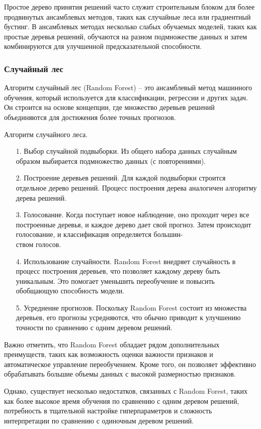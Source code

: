 Простое дерево принятия решений часто служит строительным блоком для более продвинутых ансамблевых методов, таких как случайные леса или градиентный бустинг. В ансамблевых методах несколько слабых обучаемых моделей, таких как простые деревья решений, обучаются на разном подмножестве данных и затем комбинируются для улучшенной предсказательной способности.


\subsubsection*{Случайный лес}
Алгоритм случайный лес (Random Forest) -- это ансамблевый метод машинного обучения, который используется для классификации, регрессии и других задач. Он строится на основе концепции, где множество деревьев решений объединяются для достижения более точных прогнозов.
\newpage

Алгоритм случайного леса.
\begin{itemize}[leftmargin=1.6\parindent]
	\item[1.] Выбор случайной подвыборки. Из общего набора данных случайным образом выбирается подмножество данных (с повторениями).
	\item[2.] Построение деревьев решений. Для каждой подвыборки строится отдельное дерево решений. Процесс построения дерева аналогичен алгоритму дерева решений.
	\item[3.] Голосование. Когда поступает новое наблюдение, оно проходит через все построенные деревья, и каждое дерево дает свой прогноз. Затем происходит голосование, и классификация определяется большин-\\ством голосов.
	\item[4.] Использование случайности. Random Forest внедряет случайность в процесс построения деревьев, что позволяет каждому дереву быть уникальным. Это помогает уменьшить переобучение и повысить обобщающую способность модели.
	\item[5.] Усреднение прогнозов. Поскольку Random Forest состоит из множества деревьев, его прогнозы усредняются, что обычно приводит к улучшению точности по сравнению с одним деревом решений.
\end{itemize}

Важно отметить, что Random Forest обладает рядом дополнительных преимуществ, таких как возможность оценки важности признаков и автоматическое управление переобучением. Кроме того, он позволяет эффективно обрабатывать большие объемы данных с высокой размерностью признаков.

Однако, существует несколько недостатков, связанных с Random Forest, таких как более высокое время обучения по сравнению с одним деревом решений, потребность в тщательной настройке гиперпараметров и сложность интерпретации по сравнению с одиночным деревом решений.

